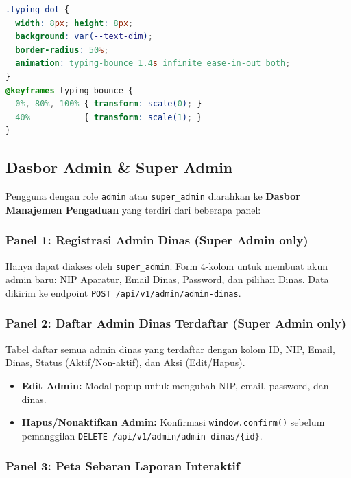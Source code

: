 \documentclass[12pt,a4paper]{article}
\begin{document}
\begin{lstlisting}[language=CSS, caption=Animasi typing indicator]
.typing-dot {
  width: 8px; height: 8px;
  background: var(--text-dim);
  border-radius: 50%;
  animation: typing-bounce 1.4s infinite ease-in-out both;
}
@keyframes typing-bounce {
  0%, 80%, 100% { transform: scale(0); }
  40%           { transform: scale(1); }
}
\end{lstlisting}

\subsection{Dasbor Admin \& Super Admin}

Pengguna dengan role \texttt{admin} atau \texttt{super\_admin} diarahkan ke
\textbf{Dasbor Manajemen Pengaduan} yang terdiri dari beberapa panel:

\subsubsection{Panel 1: Registrasi Admin Dinas (Super Admin only)}

Hanya dapat diakses oleh \texttt{super\_admin}. Form 4-kolom untuk membuat akun
admin baru: NIP Aparatur, Email Dinas, Password, dan pilihan Dinas. Data dikirim
ke endpoint \texttt{POST /api/v1/admin/admin-dinas}.

\subsubsection{Panel 2: Daftar Admin Dinas Terdaftar (Super Admin only)}

Tabel daftar semua admin dinas yang terdaftar dengan kolom ID, NIP, Email, Dinas,
Status (Aktif/Non-aktif), dan Aksi (Edit/Hapus).

\begin{itemize}[leftmargin=2em, itemsep=4pt]
  \item \textbf{Edit Admin:} Modal popup untuk mengubah NIP, email, password, dan dinas.
  \item \textbf{Hapus/Nonaktifkan Admin:} Konfirmasi \texttt{window.confirm()} sebelum
        pemanggilan \texttt{DELETE /api/v1/admin/admin-dinas/\{id\}}.
\end{itemize}

\subsubsection{Panel 3: Peta Sebaran Laporan Interaktif}
\end{document}
